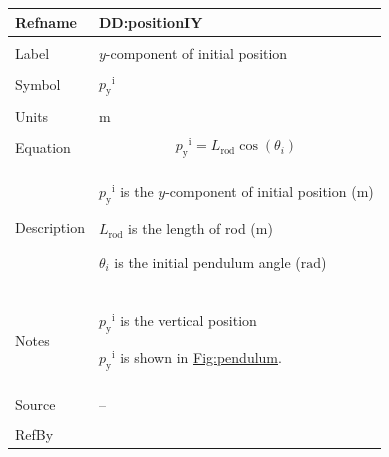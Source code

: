 \documentclass[12pt]{article}
\begin{document}
\vspace{\baselineskip}
\noindent
\begin{minipage}{\textwidth}
\begin{tabular}{>{\raggedright}p{}>{\raggedright\arraybackslash}p{}}
\toprule \textbf{Refname} & \textbf{DD:positionIY}
\label{DD:positionIY}
\\ \midrule \\
Label & $y$-component of initial position
        
\\ \midrule \\
Symbol & ${{p_{\text{y}}}^{\text{i}}}$
         
\\ \midrule \\
Units & ${\text{m}}$
        
\\ \midrule \\
Equation & \begin{displaymath}
           {{p_{\text{y}}}^{\text{i}}}={L_{\text{rod}}} \cos\left({θ_{i}}\right)
           \end{displaymath}
\\ \midrule \\
Description & \begin{symbDescription}
              \item{${{p_{\text{y}}}^{\text{i}}}$ is the $y$-component of initial position (${\text{m}}$)}
              \item{${L_{\text{rod}}}$ is the length of rod (${\text{m}}$)}
              \item{${θ_{i}}$ is the initial pendulum angle (${\text{rad}}$)}
              \end{symbDescription}
\\ \midrule \\
Notes & ${{p_{\text{y}}}^{\text{i}}}$ is the vertical position
        
        ${{p_{\text{y}}}^{\text{i}}}$ is shown in \hyperref[Figure:pendulum]{Fig:pendulum}.
        
\\ \midrule \\
Source & --
         
\\ \midrule \\
RefBy & 
\\ \bottomrule
\end{tabular}
\end{minipage}
\end{document}
